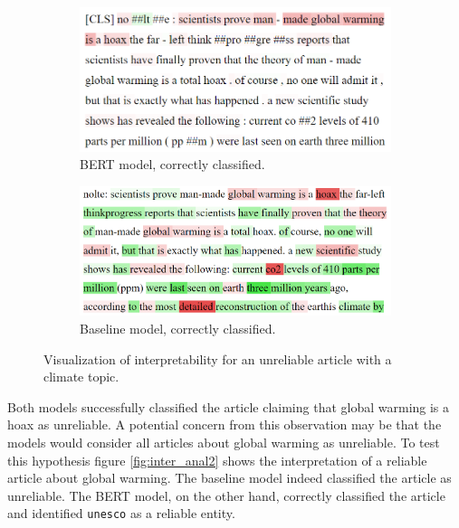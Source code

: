 \begin{figure}[H]
    \centering
    \begin{subfigure}{.5\textwidth}
      \centering
      \includegraphics[width=\linewidth]{obrazky-figures/global_warming2.png}
      \caption{BERT model, correctly classified.}
      \label{fig:inter_anal1_a}
    \end{subfigure}%
    \begin{subfigure}{.5\textwidth}
      \centering
      \includegraphics[width=\linewidth]{obrazky-figures/bayes_glob_warm.png}
      \caption{Baseline model, correctly classified.}
      \label{fig:inter_anal1_b}
    \end{subfigure}
    \caption{Visualization of interpretability for an unreliable article with a climate topic.}
    \label{fig:inter_anal1}
\end{figure}

Both models successfully classified the article claiming that global warming is a hoax as unreliable. A potential concern from this observation may be that the models would consider all articles about global warming as unreliable. To test this hypothesis figure \ref{fig:inter_anal2} shows the interpretation of a reliable article about global warming. The baseline model indeed classified the article as unreliable. The BERT model, on the other hand, correctly classified the article and identified \texttt{unesco} as a reliable entity.


